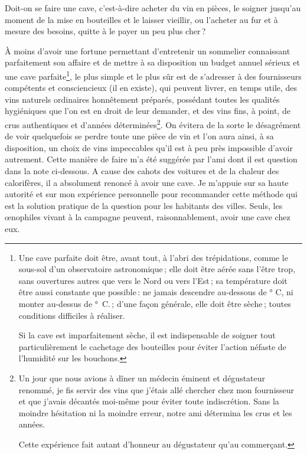 Doit-on se faire une cave, c'est-à-dire acheter du vin en pièces, le soigner
jusqu'au moment de la mise en bouteilles et le laisser vieillir, ou l'acheter
au fur et à mesure des besoins, quitte à le payer un peu plus cher ?

À moins d'avoir une fortune permettant d'entretenir un sommelier connaissant
parfaitement son affaire et de mettre à sa disposition un budget annuel sérieux
et une cave parfaite\footnote{Une cave parfaite doit être, avant tout, à l'abri
des trépidations, comme le sous-sol d'un observatoire astronomique ; elle doit
être aérée sans l'être trop, sans ouvertures autres que vers le Nord ou vers
l'Est ; sa température doit être aussi constante que possible : ne jamais
descendre au-dessous de {\mmm}° C, ni monter au-dessus de
{\mmm}° C. ; d'une façon générale, elle doit être sèche ; toutes
conditions difficiles à réaliser.

Si la cave est imparfaitement sèche, il est indispensable de soigner tout
particulièrement le cachetage des bouteilles pour éviter l’action néfaste de
l'humidité sur les bouchons.}, le plus simple et le plus sûr est de s'adresser
à des fournisseurs compétents et consciencieux (il en existe), qui peuvent
livrer, en temps utile, des vins naturels ordinaires honnêtement préparés,
possédant toutes les qualités hygiéniques que l'on est en droit de leur
demander, et des vins fins, à point, de crus authentiques et d'années
déterminées\footnote{ Un jour que nous avions à dîner un médecin éminent et
dégustateur renommé, je fis servir des vins que j'étais allé chercher chez mon
fournisseur et que j'avais décantés moi-même pour éviter toute indiscrétion.
Sans la moindre hésitation ni la moindre erreur, notre ami détermina les crus
et les années.

Cette expérience fait autant d'honneur au dégustateur qu'au commerçant.}. On
évitera de la sorte le désagrément de voir quelquefois se perdre toute une
pièce de vin et l’on aura ainsi, à sa disposition, un choix de vins impeccables
qu'il est à peu près impossible d'avoir autrement. Cette manière de faire m'a
été suggérée par l'ami dont il est question dans la note ci-dessous. A cause
des cahots des voitures et de la chaleur des calorifères, il a absolument
renoncé à avoir une cave. Je m'appuie sur sa haute autorité et sur mon
expérience personnelle pour recommander cette méthode qui est la solution
pratique de la question pour les habitants des villes. Seuls, les œnophiles
vivant à la campagne peuvent, raisonnablement, avoir une cave chez eux.

